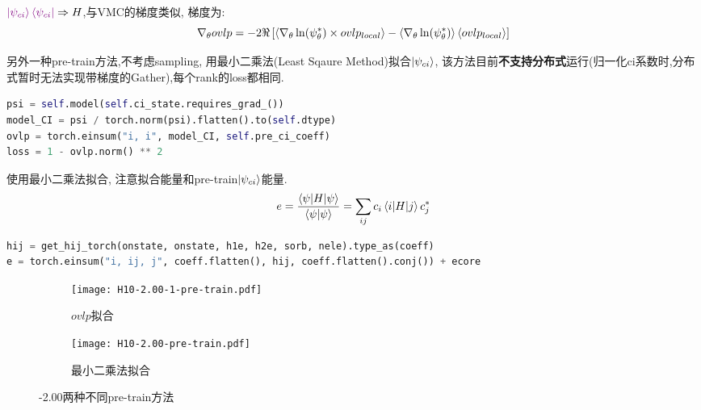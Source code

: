 $\textcolor{violet}{\ket{\psi_{ci}}\bra{\psi_{ci}}}\Rightarrow H $,与VMC的梯度类似, 梯度为:
\begin{equation}
    \nabla_{\theta}ovlp = -2\Re\left[\braket{\nabla_{\theta}\ln(\psi_{\theta}^*) \times ovlp_{local}}
                        -\braket{\nabla_{\theta}\ln(\psi_{\theta}^*)}\braket{ovlp_{local}}\right]
\end{equation}

另外一种pre-train方法,不考虑sampling, 用最小二乘法(Least Sqaure Method)拟合$\ket{\psi_{ci}}$,
该方法目前\textbf{不支持分布式}运行(归一化ci系数时,分布式暂时无法实现带梯度的Gather),每个rank的loss都相同.
\begin{lstlisting}[language=Python]
psi = self.model(self.ci_state.requires_grad_())
model_CI = psi / torch.norm(psi).flatten().to(self.dtype)
ovlp = torch.einsum("i, i", model_CI, self.pre_ci_coeff)
loss = 1 - ovlp.norm() ** 2
\end{lstlisting}
使用最小二乘法拟合,
注意拟合能量和pre-train$\ket{\psi_{ci}}$能量.
\begin{equation}
    e = \frac{\braket{\psi|H|\psi}}{\braket{\psi|\psi}} = \sum_{ij}c_i\braket{i|H|j}c_j^*
    \label{ci}
\end{equation}

\begin{lstlisting}[language=Python]
hij = get_hij_torch(onstate, onstate, h1e, h2e, sorb, nele).type_as(coeff)
e = torch.einsum("i, ij, j", coeff.flatten(), hij, coeff.flatten().conj()) + ecore
\end{lstlisting}

\begin{figure}[htp]
    \begin{subfigure}[b]{0.48\textwidth}
        \centering
        \texttt{[image: H10-2.00-1-pre-train.pdf]}
        \caption{$ovlp$拟合}
    \end{subfigure}
    \begin{subfigure}[b]{0.48\textwidth}
        \centering
        \texttt{[image: H10-2.00-pre-train.pdf]}
        \caption{最小二乘法拟合}
    \end{subfigure}
    \caption{-2.00两种不同pre-train方法}
\end{figure}

